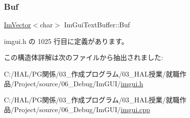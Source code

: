 \subsubsection{\texorpdfstring{Buf}{Buf}}
{\footnotesize\ttfamily \mbox{\hyperlink{class_im_vector}{Im\+Vector}}$<$char$>$ Im\+Gui\+Text\+Buffer\+::\+Buf}



 imgui.\+h の 1025 行目に定義があります。



この構造体詳解は次のファイルから抽出されました\+:\begin{DoxyCompactItemize}
\item 
C\+:/\+H\+A\+L/\+P\+G関係/03\+\_\+作成プログラム/03\+\_\+\+H\+A\+L授業/就職作品/\+Project/source/06\+\_\+\+Debug/\+Im\+G\+U\+I/\mbox{\hyperlink{imgui_8h}{imgui.\+h}}\item 
C\+:/\+H\+A\+L/\+P\+G関係/03\+\_\+作成プログラム/03\+\_\+\+H\+A\+L授業/就職作品/\+Project/source/06\+\_\+\+Debug/\+Im\+G\+U\+I/\mbox{\hyperlink{imgui_8cpp}{imgui.\+cpp}}\end{DoxyCompactItemize}
